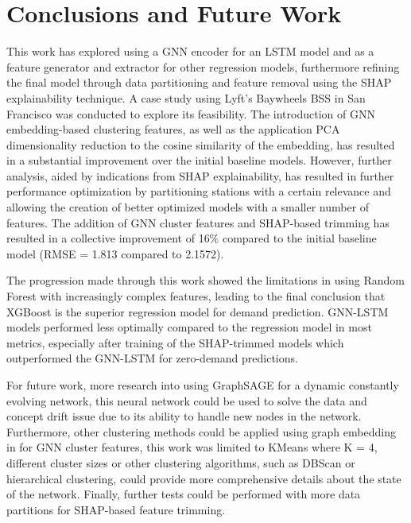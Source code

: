 \documentclass{article}
\begin{document}
\section{Conclusions and Future Work}

This work has explored using a GNN encoder for an LSTM model and as a feature generator and extractor for other regression models, furthermore refining the final model through data partitioning and feature removal using the SHAP explainability technique. A case study using Lyft's Baywheels BSS in San Francisco was conducted to explore its feasibility. The introduction of GNN embedding-based clustering features, as well as the application PCA dimensionality reduction to the cosine similarity of the embedding, has resulted in a substantial improvement over the initial baseline models. However, further analysis, aided by indications from SHAP explainability, has resulted in further performance optimization by partitioning stations with a certain relevance and allowing the creation of better optimized models with a smaller number of features. The addition of GNN cluster features and SHAP-based trimming has resulted in a collective improvement of 16\% compared to the initial baseline model (RMSE = 1.813 compared to 2.1572).

The progression made through this work showed the limitations in using Random Forest with increasingly complex features, leading to the final conclusion that XGBoost is the superior regression model for demand prediction. GNN-LSTM models performed less optimally compared to the regression model in most metrics, especially after training of the SHAP-trimmed models which outperformed the GNN-LSTM for zero-demand predictions.

For future work, more research into using GraphSAGE for a dynamic constantly evolving network, this neural network could be used to solve the data and concept drift issue due to its ability to handle new nodes in the network. Furthermore, other clustering methods could be applied using graph embedding in for GNN cluster features, this work was limited to KMeans where K = 4, different cluster sizes or other clustering algorithms, such as DBScan or hierarchical clustering, could provide more comprehensive details about the state of the network. Finally, further tests could be performed with more data partitions for SHAP-based feature trimming.

\newpage



\end{document}
